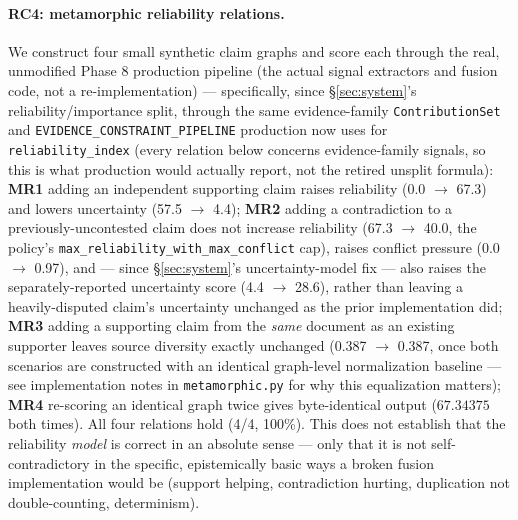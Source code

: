 \paragraph{RC4: metamorphic reliability relations.} We construct four
small synthetic claim graphs and score each through the real, unmodified
Phase 8 production pipeline (the actual signal extractors and fusion code,
not a re-implementation) --- specifically, since \S\ref{sec:system}'s
reliability/importance split, through the same evidence-family
\texttt{ContributionSet} and \texttt{EVIDENCE\_CONSTRAINT\_PIPELINE}
production now uses for \texttt{reliability\_index} (every relation below
concerns evidence-family signals, so this is what production would
actually report, not the retired unsplit formula): \textbf{MR1} adding an
independent supporting claim raises reliability (0.0 $\rightarrow$ 67.3)
and lowers uncertainty (57.5 $\rightarrow$ 4.4); \textbf{MR2} adding a
contradiction to a previously-uncontested claim does not increase
reliability (67.3 $\rightarrow$ 40.0, the policy's
\texttt{max\_reliability\_with\_max\_conflict} cap), raises conflict
pressure (0.0 $\rightarrow$ 0.97), and --- since \S\ref{sec:system}'s
uncertainty-model fix --- also raises the separately-reported uncertainty
score (4.4 $\rightarrow$ 28.6), rather than leaving a heavily-disputed
claim's uncertainty unchanged as the prior implementation did;
\textbf{MR3} adding a supporting claim from the \emph{same} document as an
existing supporter leaves source diversity exactly unchanged (0.387
$\rightarrow$ 0.387, once both scenarios are constructed with an identical
graph-level normalization baseline --- see implementation notes in
\texttt{metamorphic.py} for why this equalization matters); \textbf{MR4}
re-scoring an identical graph twice gives byte-identical output
($67.34375$ both times). All four relations hold (4/4, 100\%). This does
not establish that the reliability \emph{model} is correct in an absolute
sense --- only that it is not self-contradictory in the specific,
epistemically basic ways a broken fusion implementation would be (support
helping, contradiction hurting, duplication not double-counting,
determinism).
